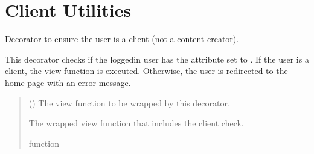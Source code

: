 \documentclass[letterpaper,10pt,english]{sphinxmanual}
\begin{document}
\section{Client Utilities}
\label{\detokenize{modules/others:module-client.decorators}}\label{\detokenize{modules/others:client-utilities}}

\begin{fulllineitems}
\label{\detokenize{modules/others:client.decorators.client_required}}
\pysigstartsignatures
{}
\pysigstopsignatures
\sphinxAtStartPar
Decorator to ensure the user is a client (not a content creator).

\sphinxAtStartPar
This decorator checks if the logged\sphinxhyphen{}in user has the  attribute set to .
If the user is a client, the view function is executed. Otherwise, the user is redirected to the home page
with an error message.
\begin{quote}\begin{description}
\sphinxAtStartPar
{} () \textendash{} The view function to be wrapped by this decorator.

\sphinxAtStartPar
The wrapped view function that includes the client check.

\sphinxAtStartPar
function

\end{description}\end{quote}

\end{fulllineitems}

\label{\detokenize{modules/others:module-client.tasks}}
\end{document}
